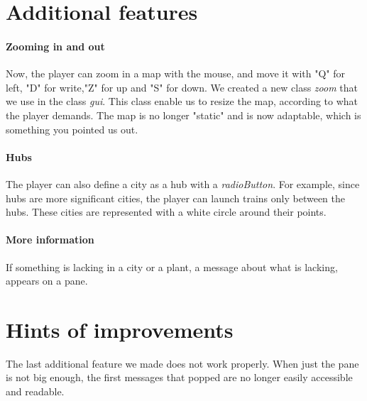 \documentclass[a4paper]{article}
\begin{document}
	\section{Additional features}
	\paragraph{Zooming in and out}
	Now, the player can zoom in a map with the mouse, and move it with "Q" for left, "D" for write,"Z" for up and "S" for down. We created a new class \textit{zoom} that we use in the class \textit{gui}. This class enable us to resize the map, according to what the player demands. The map is no longer "static" and is now adaptable, which is something you pointed us out.
	\paragraph{Hubs}
	The player can also define a city as a hub with a \textit{radioButton}. For example, since hubs are more significant cities, the player can launch trains only between the hubs. These cities are represented with a white circle around their points.
	\paragraph{More information}
	If something is lacking in a city or a plant, a message about what is lacking, appears on a pane.
	
	\section{Hints of improvements}
	The last additional feature we made does not work properly.
	When just the pane is not big enough, the first messages that popped are no longer easily accessible and readable. 
	
\end{document}
